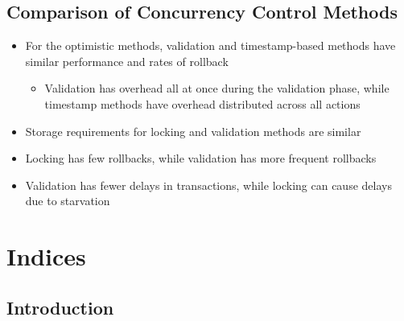 \documentclass[a4paper]{article}
\begin{document}
\subsection{Comparison of Concurrency Control Methods}
\begin{itemize}
\item For the optimistic methods, validation and timestamp-based methods have similar performance and rates of rollback
\begin{itemize}
\item Validation has overhead all at once during the validation phase, while timestamp methods have overhead distributed across all actions
\end{itemize}
\item Storage requirements for locking and validation methods are similar
\item Locking has few rollbacks, while validation has more frequent rollbacks
\item Validation has fewer delays in transactions, while locking can cause delays due to starvation
\end{itemize}


\section{Indices}
\label{indices}
\subsection{Introduction}
\end{document}
